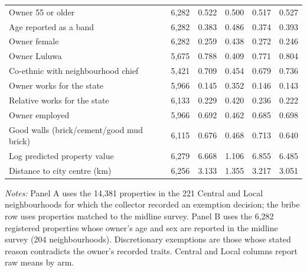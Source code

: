 \begin{table}[!htbp]
\begin{threeparttable}
\begin{tabular}{lrrrrr}
Owner 55 or older & 6,282 & 0.522 & 0.500 & 0.517 & 0.527 \\
Age reported as a band & 6,282 & 0.383 & 0.486 & 0.374 & 0.393 \\
Owner female & 6,282 & 0.259 & 0.438 & 0.272 & 0.246 \\
Owner Luluwa & 5,675 & 0.788 & 0.409 & 0.771 & 0.804 \\
Co-ethnic with neighbourhood chief & 5,421 & 0.709 & 0.454 & 0.679 & 0.736 \\
Owner works for the state & 5,966 & 0.145 & 0.352 & 0.146 & 0.143 \\
Relative works for the state & 6,133 & 0.229 & 0.420 & 0.236 & 0.222 \\
Owner employed & 5,966 & 0.692 & 0.462 & 0.685 & 0.698 \\
Good walls (brick/cement/good mud brick) & 6,115 & 0.676 & 0.468 & 0.713 & 0.640 \\
Log predicted property value & 6,279 & 6.668 & 1.106 & 6.855 & 6.485 \\
Distance to city centre (km) & 6,256 & 3.133 & 1.355 & 3.217 & 3.051 \\
\bottomrule
\end{tabular}
\begin{tablenotes}[flushleft]\scriptsize
\item \textit{Notes:} Panel A uses the 14,381 properties in the 221 Central and Local neighbourhoods for which the collector recorded an exemption decision; the bribe row uses properties matched to the midline survey. Panel B uses the 6,282 registered properties whose owner's age and sex are reported in the midline survey (204 neighbourhoods). Discretionary exemptions are those whose stated reason contradicts the owner's recorded traits. Central and Local columns report raw means by arm.
\end{tablenotes}
\end{threeparttable}
\end{table}